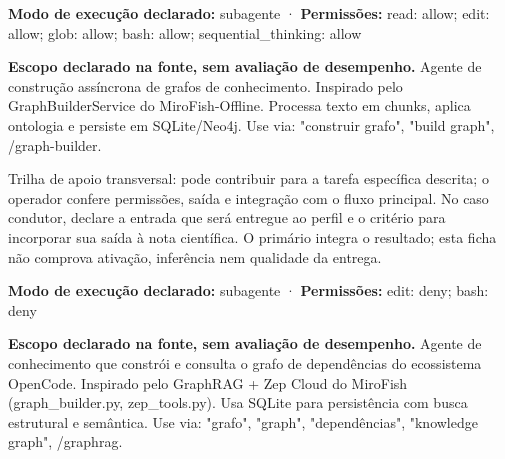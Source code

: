\begin{arquitetura}
\textbf{Modo de execução declarado:} subagente · \textbf{Permissões:} read: allow; edit: allow; glob: allow; bash: allow; sequential\_thinking: allow
\end{arquitetura}


\begin{descricao}
\textbf{Escopo declarado na fonte, sem avaliação de desempenho.}
Agente de construção assíncrona de grafos de conhecimento. Inspirado pelo GraphBuilderService do MiroFish-Offline. Processa texto em chunks, aplica ontologia e persiste em SQLite/Neo4j. Use via: "construir grafo", "build graph", /graph-builder.
\end{descricao}

\begin{funcao}
Trilha de apoio transversal: pode contribuir para a tarefa específica descrita; o operador confere permissões, saída e integração com o fluxo principal. No caso condutor, declare a entrada que será entregue ao perfil e o critério para incorporar sua saída à nota científica. O primário integra o resultado; esta ficha não comprova ativação, inferência nem qualidade da entrega.
\end{funcao}

\begin{arquitetura}
\textbf{Modo de execução declarado:} subagente · \textbf{Permissões:} edit: deny; bash: deny
\end{arquitetura}


\begin{descricao}
\textbf{Escopo declarado na fonte, sem avaliação de desempenho.}
Agente de conhecimento que constrói e consulta o grafo de dependências do ecossistema OpenCode. Inspirado pelo GraphRAG + Zep Cloud do MiroFish (graph\_builder.py, zep\_tools.py). Usa SQLite para persistência com busca estrutural e semântica. Use via: "grafo", "graph", "dependências", "knowledge graph", /graphrag.
\end{descricao}

